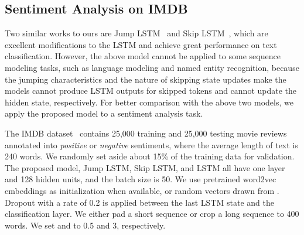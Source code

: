 \documentclass[letterpaper]{article} \usepackage{aaai19}  \usepackage{times}  \usepackage{helvet}  \usepackage{courier}  \usepackage{url}  \usepackage{graphicx}  \usepackage{amsmath}
\begin{document}
\begin{table}[t]
\centering
{}
\caption{Accuracy on the IMDB test set.}
  \label{tab:sentiment}
\end{table}


\subsection{Sentiment Analysis on IMDB}
Two similar works to ours are Jump LSTM~\cite{yu2017learning} and Skip LSTM~\cite{campos2017skip}, which are excellent modifications to the LSTM and achieve great performance on text classification. However, the above model cannot be applied to some sequence modeling tasks, such as language modeling and named entity recognition, because the jumping characteristics and the nature of skipping state updates make the models cannot produce LSTM outputs for skipped tokens and cannot update the hidden state, respectively. For better comparison with the above two models, we apply the proposed model to a sentiment analysis task.

The IMDB dataset~\cite{maas2011learning} contains 25,000 training and 25,000 testing movie reviews annotated into \textit{positive} or \textit{negative} sentiments, where the average length of text is 240 words. We randomly set aside about 15\% of the training data for validation. The proposed model, Jump LSTM, Skip LSTM, and LSTM all have one layer and 128 hidden units, and the batch size is 50. We use pretrained word2vec embeddings as initialization when available, or random vectors drawn from . Dropout with a rate of 0.2 is applied between the last LSTM state and the classification layer. We either pad a short sequence or crop a long sequence to 400 words. We set  and  to 0.5 and 3, respectively.
\end{document}
